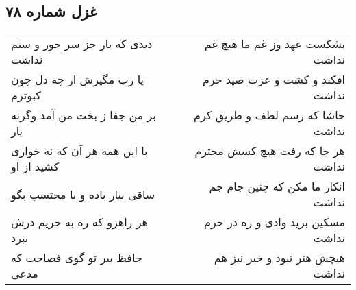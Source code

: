 \begin{center}
\section*{غزل شماره ۷۸}
\label{sec:sh078}
\begin{longtable}{l p{0.5cm} r}
دیدی که یار جز سر جور و ستم نداشت
&&
بشکست عهد وز غم ما هیچ غم نداشت
\\
یا رب مگیرش ار چه دل چون کبوترم
&&
افکند و کشت و عزت صید حرم نداشت
\\
بر من جفا ز بخت من آمد وگرنه یار
&&
حاشا که رسم لطف و طریق کرم نداشت
\\
با این همه هر آن که نه خواری کشید از او
&&
هر جا که رفت هیچ کسش محترم نداشت
\\
ساقی بیار باده و با محتسب بگو
&&
انکار ما مکن که چنین جام جم نداشت
\\
هر راهرو که ره به حریم درش نبرد
&&
مسکین برید وادی و ره در حرم نداشت
\\
حافظ ببر تو گوی فصاحت که مدعی
&&
هیچش هنر نبود و خبر نیز هم نداشت
\\
\end{longtable}
\end{center}
